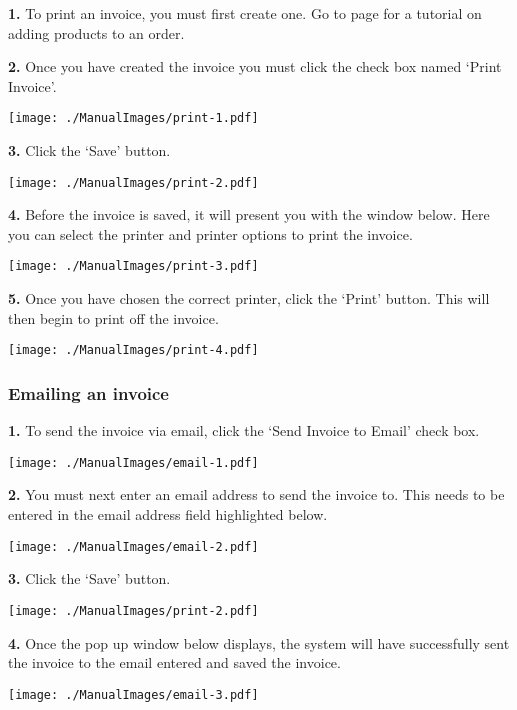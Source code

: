 \textbf{1.} To print an invoice, you must first create one. Go to page \pageref{fig:Adding products to an order} for a tutorial on adding products to an order.

\textbf{2.} Once you have created the invoice you must click the check box named `Print Invoice'.

\texttt{[image: ./ManualImages/print-1.pdf]}

\pagebreak

\textbf{3.} Click the `Save' button.

\texttt{[image: ./ManualImages/print-2.pdf]}

\pagebreak

\textbf{4.} Before the invoice is saved, it will present you with the window below. Here you can select the printer and printer options to print the invoice.

\texttt{[image: ./ManualImages/print-3.pdf]}

\pagebreak

\textbf{5.} Once you have chosen the correct printer, click the `Print' button. This will then begin to print off the invoice.

\texttt{[image: ./ManualImages/print-4.pdf]}

\pagebreak
\subsubsection{Emailing an invoice}
\label{fig:Emailing an invoice}

\textbf{1.} To send the invoice via email, click the `Send Invoice to Email' check box.

\texttt{[image: ./ManualImages/email-1.pdf]}

\textbf{2.} You must next enter an email address to send the invoice to. This needs to be entered in the email address field highlighted below.

\texttt{[image: ./ManualImages/email-2.pdf]}

\pagebreak

\textbf{3.} Click the `Save' button.

\texttt{[image: ./ManualImages/print-2.pdf]}

\textbf{4.} Once the pop up window below displays, the system will have successfully sent the invoice to the email entered and saved the invoice.

\texttt{[image: ./ManualImages/email-3.pdf]}

